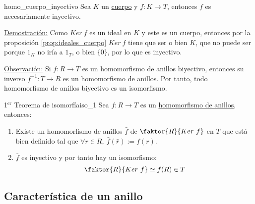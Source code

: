 \documentclass[10pt, a4paper]{article}
\newcommand{\obs}{\underline{Observación:} }
\newcommand{\demo}{\underline{Demostración:} }
\newcommand{\cuerpo}[1][]{\hyperref[def:cuerpo]{cuerpo}#1 }
\newenvironment{enumeratea}{\begin{enumerate}[label=\arabic*)]}
{\end{enumerate}}
\begin{document}
\begin{corolary}{}{homo_cuerpo_inyectivo}
Sea $K$ un \cuerpo y $f : K \longrightarrow T$, entonces $f$ es necesariamente inyectivo.
\end{corolary}

\demo Como $Ker\ f$ es un ideal en $K$ y este es un cuerpo, entonces por la proposición \ref{prop:ideales_cuerpo} $Ker\ f$ tiene que ser o bien $K$, que no puede ser porque $1_K$ no iría a $1_T$, o bien $\{0\}$, por lo que es inyectivo.

\vspace{3mm}

\obs Si $f : R \longrightarrow T$ es un homomorfismo de anillos biyectivo, entonces su inverso $f^{-1} : T \longrightarrow R$ es un homomorfismo de anillos. Por tanto, todo homomorfismo de anillos biyectivo es un isomorfismo.

\begin{theorem}{1$^{\text{er}}$ Teorema de isomorfía}{iso_1}
Sea $f : R \longrightarrow T$ es un \hyperref[def:homomorfismo]{homomorfismo de anillos}, entonces:
\begin{enumeratea}
	\item Existe un homomorfismo de anillos $\bar{f}$ de $\faktor{R}{Ker\ f}$ en $T$ que está bien definido tal que $\forall r \in R,\ \bar{f}(\bar{r}) := f(r)$.

	\vspace{-5mm}

	\begin{center}
	\end{center}
	\item $\bar{f}$ es inyectivo y por tanto hay un isomorfismo:
	\[
	\faktor{R}{Ker\ f} \simeq f(R) \in T
	\]
	
\end{enumeratea}
\end{theorem}

\subsection{Característica de un anillo}
\end{document}
